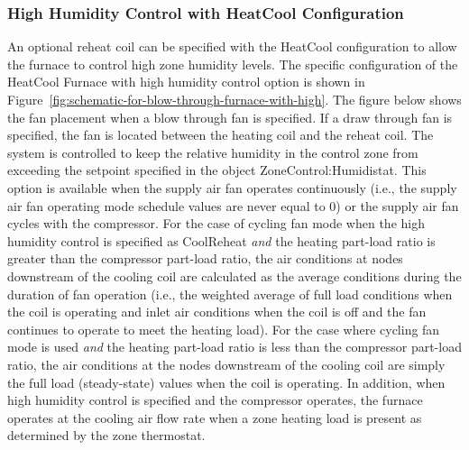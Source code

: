 \subsubsection{High Humidity Control with HeatCool Configuration}\label{high-humidity-control-with-heatcool-configuration}

An optional reheat coil can be specified with the HeatCool configuration to allow the furnace to control high zone humidity levels. The specific configuration of the HeatCool Furnace with high humidity control option is shown in Figure~\ref{fig:schematic-for-blow-through-furnace-with-high}. The figure below shows the fan placement when a blow through fan is specified. If a draw through fan is specified, the fan is located between the heating coil and the reheat coil. The system is controlled to keep the relative humidity in the control zone from exceeding the setpoint specified in the object ZoneControl:Humidistat. This option is available when the supply air fan operates continuously (i.e., the supply air fan operating mode schedule values are never equal to 0) or the supply air fan cycles with the compressor. For the case of cycling fan mode when the high humidity control is specified as CoolReheat \emph{and} the heating part-load ratio is greater than the compressor part-load ratio, the air conditions at nodes downstream of the cooling coil are calculated as the average conditions during the duration of fan operation (i.e., the weighted average of full load conditions when the coil is operating and inlet air conditions when the coil is off and the fan continues to operate to meet the heating load). For the case where cycling fan mode is used \emph{and} the heating part-load ratio is less than the compressor part-load ratio, the air conditions at the nodes downstream of the cooling coil are simply the full load (steady-state) values when the coil is operating. In addition, when high humidity control is specified and the compressor operates, the furnace operates at the cooling air flow rate when a zone heating load is present as determined by the zone thermostat.

